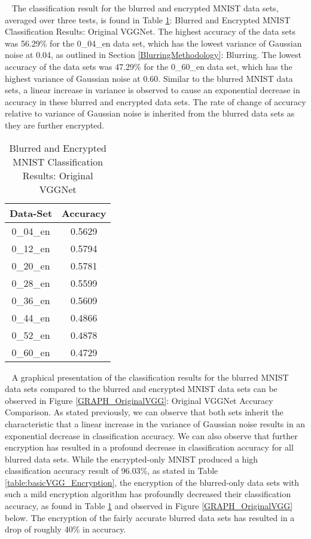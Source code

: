 \documentclass[12pt, titlepage]{article}
\begin{document}
~\newpage
\noindent The classification result for the blurred and encrypted MNIST data sets, averaged over three tests, is found in Table \ref{table:basicVGG_BlurredEncrypted}: Blurred and Encrypted MNIST Classification Results: Original VGGNet. The highest accuracy of the data sets was 56.29\% for the 0\_04\_en data set, which has the lowest variance of Gaussian noise at 0.04, as outlined in Section \ref{BlurringMethodology}: Blurring. The lowest accuracy of the data sets was 47.29\% for the 0\_60\_en data set, which has the highest variance of Gaussian noise at 0.60. Similar to the blurred MNIST data sets, a linear increase in variance is observed to cause an exponential decrease in accuracy in these blurred and encrypted data sets. The rate of change of accuracy relative to variance of Gaussian noise is inherited from the blurred data sets as they are further encrypted.\\ 

\begin{table}[!h]
	\begin{center}
		\begin{tabular}{| c | c |}
			\hline
			\textbf{Data-Set} & \textbf{Accuracy}\\
			\hline
			0\_04\_en & 0.5629\\
			\hline
			0\_12\_en & 0.5794\\
			\hline
			0\_20\_en & 0.5781\\
			\hline
			0\_28\_en & 0.5599\\
			\hline
			0\_36\_en & 0.5609\\
			\hline
			0\_44\_en & 0.4866\\
			\hline
			0\_52\_en & 0.4878\\
			\hline
			0\_60\_en & 0.4729\\
			\hline
		\end{tabular}
		\caption{Blurred and Encrypted MNIST Classification Results: Original VGGNet}
		\label{table:basicVGG_BlurredEncrypted}
	\end{center}
\end{table}

~\newpage
\noindent A graphical presentation of the classification results for the blurred MNIST data sets compared to the blurred and encrypted MNIST data sets can be observed in Figure \ref{GRAPH_OriginalVGG}: Original VGGNet Accuracy Comparison. As stated previously, we can observe that both sets inherit the characteristic that a linear increase in the variance of Gaussian noise results in an exponential decrease in classification accuracy. We can also observe that further encryption has resulted in a profound decrease in classification accuracy for all blurred data sets. While the encrypted-only MNIST produced a high classification accuracy result of 96.03\%, as stated in Table \ref{table:basicVGG_Encryption}, the encryption of the blurred-only data sets with such a mild encryption algorithm has profoundly decreased their classification accuracy, as found in Table \ref{table:basicVGG_BlurredEncrypted} and observed in Figure \ref{GRAPH_OriginalVGG} below. The encryption of the fairly accurate blurred data sets has resulted in a drop of roughly 40\% in accuracy.
\end{document}
